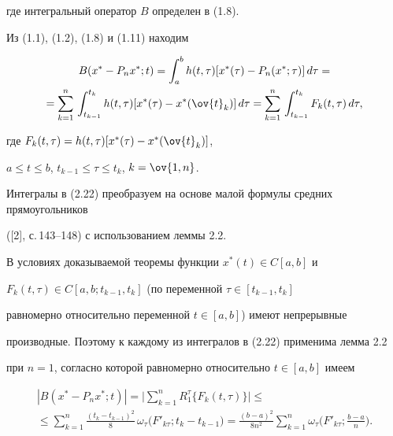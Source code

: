 где интегральный оператор $B$ определен в (1.8).





Из (1.1), (1.2), (1.8) и (1.11) находим


\begin{multline}


B(x^*-P_nx^*;t)=\intl_a^bh(t,\tau)[x^*(\tau)-P_n(x^*;\tau)]\, d\tau= \\


%


=\sum_{k=1}^n\, \intl_{t_{k-1}}^{t_k}h(t,\tau)[x^*(\tau)-


x^*(\ov{t}_k)]\, d\tau=


\sum_{k=1}^n\, \intl_{t_{k-1}}^{t_k}F_k(t,\tau)\, d\tau,


\end{multline}


где $F_k(t,\tau)= h(t,\tau) [x^*(\tau)- x^*(\ov{t}_k)]$,


$a\leq t\leq b$, $t_{k-1}\leq \tau\leq t_k$, $k=\ov{1,n}$.


Интегралы в (2.22) преобразуем на основе малой формулы средних прямоугольников


([2], с.\,143--148) с использованием леммы 2.2.





В условиях доказываемой теоремы функции $x^*(t)\in C[a,b]$ и


$F_k(t,\tau)\in C[a,b;t_{k-1},t_k]$ (по переменной $\tau\in [t_{k-1},t_k]$


равномерно относительно переменной $t\in [a,b]$) имеют непрерывные


производные. Поэтому к каждому из интегралов в (2.22) применима лемма 2.2


при $n=1$, согласно которой равномерно относительно $t\in [a,b]$ имеем


\begin{multline}


|B(x^*-P_nx^*;t)|=\bigg| \sum_{k=1}^nR_1^\tau \{F_k(t,\tau)\}\bigg|\leq \\


%


\leq \sum_{k=1}^n\frac{(t_k-t_{k-1})^2}{8}\, \omega_\tau\bigl(F'_{k\tau};


t_k-t_{k-1}\bigr)=


\frac{(b-a)^2}{8n^2}\sum_{k=1}^n \omega_\tau\bigg(F'_{k\tau};


\frac{b-a}{n}\bigg) .


\end{multline}





